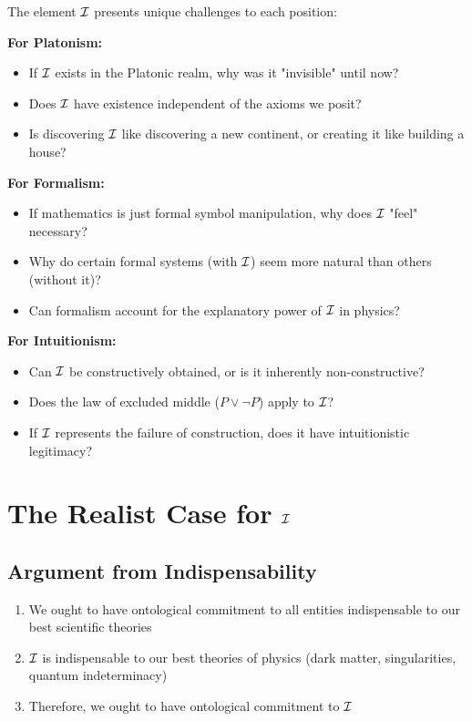 The element $\mathcal{I}$ presents unique challenges to each position:

\textbf{For Platonism:}
\begin{itemize}
    \item If $\mathcal{I}$ exists in the Platonic realm, why was it "invisible" until now?
    \item Does $\mathcal{I}$ have existence independent of the axioms we posit?
    \item Is discovering $\mathcal{I}$ like discovering a new continent, or creating it like building a house?
\end{itemize}

\textbf{For Formalism:}
\begin{itemize}
    \item If mathematics is just formal symbol manipulation, why does $\mathcal{I}$ "feel" necessary?
    \item Why do certain formal systems (with $\mathcal{I}$) seem more natural than others (without it)?
    \item Can formalism account for the explanatory power of $\mathcal{I}$ in physics?
\end{itemize}

\textbf{For Intuitionism:}
\begin{itemize}
    \item Can $\mathcal{I}$ be constructively obtained, or is it inherently non-constructive?
    \item Does the law of excluded middle ($P \lor \neg P$) apply to $\mathcal{I}$?
    \item If $\mathcal{I}$ represents the failure of construction, does it have intuitionistic legitimacy?
\end{itemize}

\section{The Realist Case for $\mathcal{I}$}

\subsection{Argument from Indispensability}

\begin{theorem}
\begin{enumerate}
    \item We ought to have ontological commitment to all entities indispensable to our best scientific theories
    \item $\mathcal{I}$ is indispensable to our best theories of physics (dark matter, singularities, quantum indeterminacy)
    \item Therefore, we ought to have ontological commitment to $\mathcal{I}$
\end{enumerate}
\end{theorem}

